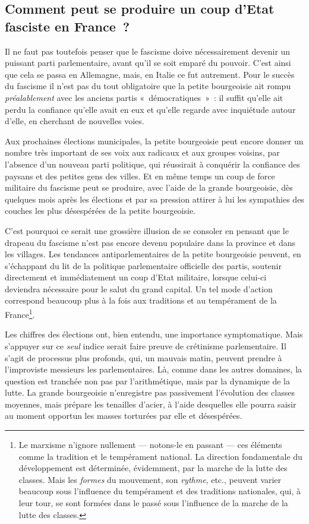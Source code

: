 \documentclass[french,twoside]{book} %
\begin{document}
\subsection[{Comment peut se produire un coup d’Etat fasciste en France ?}]{Comment peut se produire un coup d’Etat fasciste en France ?}
\noindent Il ne faut pas toutefois penser que le fascisme doive nécessairement devenir un puissant parti parlementaire, avant qu’il se soit emparé du pouvoir. C’est ainsi que cela se passa en Allemagne, mais, en Italie ce fut autrement. Pour le succès du fascisme il n’est pas du tout obligatoire que la petite bourgeoisie ait rompu \emph{préalablement} avec les  anciens partis « démocratiques » : il suffit qu’elle ait perdu la confiance qu’elle avait en eux et qu’elle regarde avec inquiétude autour d’elle, en cherchant de nouvelles voies.\par
Aux prochaines élections municipales, la petite bourgeoisie peut encore donner un nombre très important de ses voix aux radicaux et aux groupes voisins, par l’absence d’un nouveau parti politique, qui réussirait à conquérir la confiance des paysans et des petites gens des villes. Et en même temps un coup de force militaire du fascisme peut se produire, avec l’aide de la grande bourgeoisie, dès quelques mois après les élections et par sa pression attirer à lui les sympathies des couches les plus désespérées de la petite bourgeoisie.\par
C’est pourquoi ce serait une grossière illusion de se consoler en pensant que le drapeau du fascisme n’est pas encore devenu populaire dans la province et dans les villages. Les tendances antiparlementaires de la petite bourgeoisie peuvent, en s’échappant du lit de la politique parlementaire officielle des partis, soutenir directement et immédiatement un coup d’Etat militaire, lorsque celui-ci deviendra nécessaire pour le salut du grand capital. Un tel mode d’action correspond beaucoup plus à la fois aux traditions et au tempérament de la France\footnote{ \noindent Le marxisme n’ignore nullement — notons-le en passant — ces éléments comme la tradition et le tempérament national. La direction fondamentale du développement est déterminée, évidemment, par la marche de la lutte des classes. Mais les \emph{formes} du mouvement, son \emph{rythme}, etc., peuvent varier beaucoup sous l’influence du tempérament et des traditions nationales, qui, à leur tour, se sont formées dans le passé sous l’influence de la marche de la lutte des classes.
 }.\par
Les chiffres des élections ont, bien entendu, une importance symptomatique. Mais s’appuyer sur ce \emph{seul} indice serait faire preuve de crétinisme parlementaire. Il s’agit de processus plus profonds, qui, un mauvais matin, peuvent prendre à l’improviste messieurs les parlementaires. Là,  comme dans les autres domaines, la question est tranchée non pas par l’arithmétique, mais par la dynamique de la lutte. La grande bourgeoisie n’enregistre pas passivement l’évolution des classes moyennes, mais prépare les tenailles d’acier, à l’aide desquelles elle pourra saisir au moment opportun les masses torturées par elle et désespérées.
\end{document}
